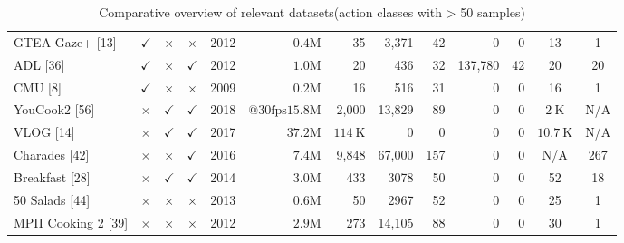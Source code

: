 \begin{table}
{\begin{tabular}{|l|c|c|c|c|r|r|r|r|r|r|c|c|}
    GTEA Gaze+ [13] & $\checkmark$ & $\times$ & $\times$ & 2012 & $0.4 \mathrm{M}$ & 35 & 3,371 & 42 & 0 & 0 & 13 & 1 \\
    ADL [36] & $\checkmark$ & $\times$ & $\checkmark$ & 2012 & $1.0 \mathrm{M}$ & 20 & 436 & 32 & 137,780 & 42 & 20 & 20 \\
    CMU [8] & $\checkmark$ & $\times$ & $\times$ & 2009 & $0.2 \mathrm{M}$ & 16 & 516 & 31 & 0 & 0 & 16 & 1 \\
    \hline YouCook2 [56] & $\times$ & $\checkmark$ & $\checkmark$ & 2018 & $@ 30 \mathrm{fps} 15.8 \mathrm{M}$ & 2,000 & 13,829 & 89 & 0 & 0 & $2 \mathrm{~K}$ & N/A \\
    VLOG [14] & $\times$ & $\checkmark$ & $\checkmark$ & 2017 & $37.2 \mathrm{M}$ & $114 \mathrm{~K}$ & 0 & 0 & 0 & 0 & $10.7 \mathrm{~K}$ & N/A \\
    Charades [42] & $\times$ & $\times$ & $\checkmark$ & 2016 & $7.4 \mathrm{M}$ & 9,848 & 67,000 & 157 & 0 & 0 & N/A & 267 \\
    Breakfast [28] & $\times$ & $\checkmark$ & $\checkmark$ & 2014 & $3.0 \mathrm{M}$ & 433 & 3078 & 50 & 0 & 0 & 52 & 18 \\
    50 Salads [44] & $\times$ & $\times$ & $\times$ & 2013 & $0.6 \mathrm{M}$ & 50 & 2967 & 52 & 0 & 0 & 25 & 1 \\
    MPII Cooking 2 [39] & $\times$ & $\times$ & $\times$ & 2012 & $2.9 \mathrm{M}$ & 273 & 14,105 & 88 & 0 & 0 & 30 & 1 \\
    \hline
    \end{tabular}}
    \caption{Comparative overview of relevant datasets(action classes with > 50 samples)}
    \label{tab:epic_comparison}
\end{table}
